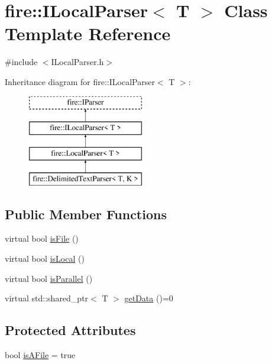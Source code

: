 \hypertarget{a00143}{}\section{fire\+:\+:I\+Local\+Parser$<$ T $>$ Class Template Reference}
\label{a00143}


{\ttfamily \#include $<$I\+Local\+Parser.\+h$>$}

Inheritance diagram for fire\+:\+:I\+Local\+Parser$<$ T $>$\+:\begin{figure}[H]
\begin{center}
\leavevmode
\includegraphics[height=4.000000cm]{a00143}
\end{center}
\end{figure}
\subsection*{Public Member Functions}
\begin{DoxyCompactItemize}
\item 
virtual bool \hyperlink{a00143_a091d5cf56bf8f407854ef87f460b2958}{is\+File} ()
\item 
virtual bool \hyperlink{a00143_a770acae6e216de3a9c7140a12de25d58}{is\+Local} ()
\item 
virtual bool \hyperlink{a00143_ad46898c516adcce38acbb4800dc9777b}{is\+Parallel} ()
\item 
virtual std\+::shared\+\_\+ptr$<$ T $>$ \hyperlink{a00143_a0fc1446d106f0ab8daf8744a4bd29a65}{get\+Data} ()=0
\end{DoxyCompactItemize}
\subsection*{Protected Attributes}
\begin{DoxyCompactItemize}
\item 
bool \hyperlink{a00143_a39adf288ae0bc79cf39fd6e4638858cf}{is\+A\+File} = true
\end{DoxyCompactItemize}


